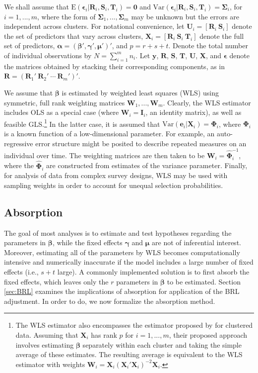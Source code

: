 \documentclass[12pt]{article}
\newcommand{\E}{\text{E}}
\newcommand{\Var}{\text{Var}}
\newcommand{\bm}{\mathbf}
\newcommand{\bs}{\boldsymbol}
\begin{document}
We shall assume that $\E\left(\bs\epsilon_i\left|\bm{R}_i,\bm{S}_i, \bm{T}_i\right.\right) = \bm{0}$ and $\Var\left(\bs\epsilon_i\left|\bm{R}_i,\bm{S}_i,\bm{T}_i\right.\right) = \bs\Sigma_i$, for $i = 1,...,m$, where the form of $\bs\Sigma_1,...,\bs\Sigma_m$ may be unknown but the errors are independent across clusters. 
For notational convenience, let $\bm{U}_i = \left[\bm{R}_i \ \bm{S}_i \right]$ denote the set of predictors that vary across clusters, $\bm{X}_i = \left[\bm{R}_i \ \bm{S}_i \ \bm{T}_i \right]$ denote the full set of predictors, $\bs\alpha = \left(\bs\beta', \bs\gamma', \bs\mu' \right)'$, and $p = r + s + t$.
Denote the total number of individual observations by $N = \sum_{i=1}^m n_i$.
Let $\bm{y}$, $\bm{R}$, $\bm{S}$, $\bm{T}$, $\bm{U}$, $\bm{X}$, and $\bs\epsilon$ denote the matrices obtained by stacking their corresponding components, as in $\bm{R} = \left(\bm{R}_1' \ \bm{R}_2' \ \cdots \ \bm{R}_m'\right)'$. 

We assume that $\bs\beta$ is estimated by weighted least squares (WLS) using symmetric, full rank weighting matrices $\bm{W}_1,...,\bm{W}_m$. 
Clearly, the WLS estimator includes OLS as a special case (where $\bm{W}_i = \bm{I}_i$, an identity matrix), as well as feasible GLS.\footnote{
The WLS estimator also encompasses the estimator proposed by \citet{Ibragimov2010tstatistic} for clustered data. 
Assuming that $\bm{X}_i$ has rank $p$ for $i = 1,...,m$, their proposed approach involves estimating $\bs\beta$ separately within each cluster and taking the simple average of these estimates. 
The resulting average is equivalent to the WLS estimator with weights $\bm{W}_i = \bm{X}_i \left(\bm{X}_i'\bm{X}_i\right)^{-2} \bm{X}_i$.} 
In the latter case, it is assumed that $\Var\left(\bm{e}_i\left|\bm{X}_i\right.\right) = \bs\Phi_i$, where $\bs\Phi_i$ is a known function of a low-dimensional parameter. 
For example, an auto-regressive error structure might be posited to describe repeated measures on an individual over time. 
The weighting matrices are then taken to be $\bm{W}_i = \hat{\bs\Phi}_i^{-1}$, where the $\hat{\bs\Phi}_i$ are constructed from estimates of the variance parameter.
Finally, for analysis of data from complex survey designs, WLS may be used with sampling weights in order to account for unequal selection probabilities.

\subsection{Absorption}

The goal of most analyses is to estimate and test hypotheses regarding the parameters in $\bs\beta$, while the fixed effects $\bs\gamma$ and $\bs\mu$ are not of inferential interest. Moreover, estimating all of the parameters by WLS becomes computationally intensive and numerically inaccurate if the model includes a large number of fixed effects (i.e., $s + t$ large). 
A commonly implemented solution is to first absorb the fixed effects, which leaves only the $r$ parameters in $\bs\beta$ to be estimated. 
Section \ref{sec:BRL} examines the implications of absorption for application of the BRL adjustment. 
In order to do, we now formalize the absorption method.
\end{document}
